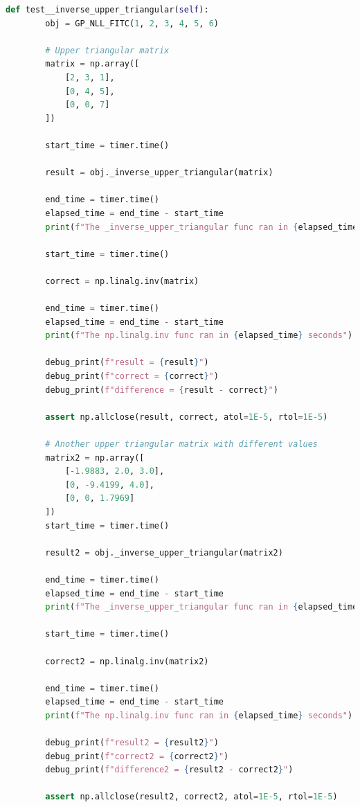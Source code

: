 \documentclass[12pt]{article}
\begin{document}
    \begin{lstlisting}[language=Python]
    def test__inverse_upper_triangular(self):
        obj = GP_NLL_FITC(1, 2, 3, 4, 5, 6)

        # Upper triangular matrix
        matrix = np.array([
            [2, 3, 1],
            [0, 4, 5],
            [0, 0, 7]
        ])

        start_time = timer.time()

        result = obj._inverse_upper_triangular(matrix)

        end_time = timer.time()
        elapsed_time = end_time - start_time
        print(f"The _inverse_upper_triangular func ran in {elapsed_time} seconds")

        start_time = timer.time()

        correct = np.linalg.inv(matrix)

        end_time = timer.time()
        elapsed_time = end_time - start_time
        print(f"The np.linalg.inv func ran in {elapsed_time} seconds")

        debug_print(f"result = {result}")
        debug_print(f"correct = {correct}")
        debug_print(f"difference = {result - correct}")

        assert np.allclose(result, correct, atol=1E-5, rtol=1E-5)

        # Another upper triangular matrix with different values
        matrix2 = np.array([
            [-1.9883, 2.0, 3.0],
            [0, -9.4199, 4.0],
            [0, 0, 1.7969]
        ])
        start_time = timer.time()

        result2 = obj._inverse_upper_triangular(matrix2)

        end_time = timer.time()
        elapsed_time = end_time - start_time
        print(f"The _inverse_upper_triangular func ran in {elapsed_time} seconds")

        start_time = timer.time()

        correct2 = np.linalg.inv(matrix2)

        end_time = timer.time()
        elapsed_time = end_time - start_time
        print(f"The np.linalg.inv func ran in {elapsed_time} seconds")

        debug_print(f"result2 = {result2}")
        debug_print(f"correct2 = {correct2}")
        debug_print(f"difference2 = {result2 - correct2}")

        assert np.allclose(result2, correct2, atol=1E-5, rtol=1E-5)
    \end{lstlisting}
\end{document}
